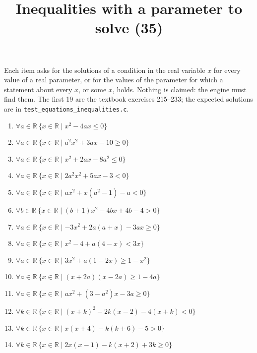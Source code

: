 \documentclass[11pt,a4paper]{article}
\title{Inequalities with a parameter to solve (35)}
\author{}
\date{}
\begin{document}
\maketitle
Each item asks for the solutions of a condition in the real variable $x$ for every value of a real parameter, or for the values of the parameter for which a statement about every $x$, or some $x$, holds. Nothing is claimed: the engine must find them. The first 19 are the textbook exercises 215--233; the expected solutions are in \texttt{test\_equations\_inequalities.c}.

\begin{enumerate}
\item $\displaystyle \forall a \in \mathbb{R}\ \{x \in \mathbb{R} \mid x^{2} - 4ax \le 0\}$
\item $\displaystyle \forall a \in \mathbb{R}\ \{x \in \mathbb{R} \mid a^{2}x^{2} + 3ax - 10 \ge 0\}$
\item $\displaystyle \forall a \in \mathbb{R}\ \{x \in \mathbb{R} \mid x^{2} + 2ax - 8a^{2} \le 0\}$
\item $\displaystyle \forall a \in \mathbb{R}\ \{x \in \mathbb{R} \mid 2a^{2}x^{2} + 5ax - 3 < 0\}$
\item $\displaystyle \forall a \in \mathbb{R}\ \{x \in \mathbb{R} \mid ax^{2} + x(a^{2} - 1) - a < 0\}$
\item $\displaystyle \forall b \in \mathbb{R}\ \{x \in \mathbb{R} \mid (b + 1)x^{2} - 4bx + 4b - 4 > 0\}$
\item $\displaystyle \forall a \in \mathbb{R}\ \{x \in \mathbb{R} \mid -3x^{2} + 2a(a + x) - 3ax \ge 0\}$
\item $\displaystyle \forall a \in \mathbb{R}\ \{x \in \mathbb{R} \mid x^{2} - 4 + a(4 - x) < 3x\}$
\item $\displaystyle \forall a \in \mathbb{R}\ \{x \in \mathbb{R} \mid 3x^{2} + a(1 - 2x) \ge 1 - x^{2}\}$
\item $\displaystyle \forall a \in \mathbb{R}\ \{x \in \mathbb{R} \mid (x + 2a)(x - 2a) \ge 1 - 4a\}$
\item $\displaystyle \forall a \in \mathbb{R}\ \{x \in \mathbb{R} \mid ax^{2} + (3 - a^{2})x - 3a \ge 0\}$
\item $\displaystyle \forall k \in \mathbb{R}\ \{x \in \mathbb{R} \mid (x + k)^{2} - 2k(x - 2) - 4(x + k) < 0\}$
\item $\displaystyle \forall k \in \mathbb{R}\ \{x \in \mathbb{R} \mid x(x + 4) - k(k + 6) - 5 > 0\}$
\item $\displaystyle \forall k \in \mathbb{R}\ \{x \in \mathbb{R} \mid 2x(x - 1) - k(x + 2) + 3k \ge 0\}$

\end{enumerate}
\end{document}
